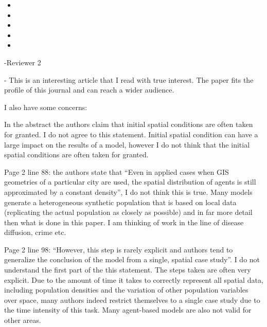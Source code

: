 \documentclass[11pt,a4paper,sans]{moderncv}        %
\begin{document}
\begin{itemize}
	\item 
	
	\item
	
	\item 
	
	\item 
	
	\item
\end{itemize}






-Reviewer 2

  -
This is an interesting article that I read with true interest. The paper fits the profile of this journal and can reach a wider audience.

I also have some concerns:

In the abstract the authors claim that initial spatial conditions are often taken for granted. I do not agree to this statement. Initial spatial condition can have a large impact on the results of a model, however I do not think that the initial spatial conditions are often taken for granted.



Page 2 line 88: the authors state that “Even in applied cases when GIS geometries of a particular city are used, the spatial distribution of agents is still approximated by a constant density”, I do not think this is true. Many models generate a heterogeneous synthetic population that is based on local data (replicating the actual population as closely as possible) and in far more detail then what is done in this paper. I am thinking of work in the line of disease diffusion, crime etc.



Page 2 line 98: “However, this step is rarely explicit and authors tend to generalize the conclusion of the model from a single, spatial case study”. I do not understand the first part of the this statement. The steps taken are often very explicit. Due to the amount of time it takes to correctly represent all spatial data, including population densities and the variation of other population variables over space, many authors indeed restrict themselves to a single case study due to the time intensity of this task. Many agent-based models are also not valid for other areas.
\end{document}
